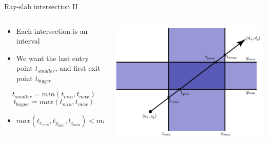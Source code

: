 \documentclass[xcolor=table]{beamer}
\begin{document}
\begin{frame}{Ray-slab intersection II}

\begin{columns}[T] %

\begin{column}{.48\textwidth}
\begin{itemize}
\item Each intersection is an interval
\item We want the last entry point $t_{smaller}$, and first exit point $t_{bigger}$
\end{itemize}

$$
t_{smaller} = min(t_{min}, t_{max})
$$
$$
t_{bigger} = max(t_{min}, t_{max})
$$
\begin{itemize}
\item $max(t_{x_{min}},t_{y_{min}},t_{z_{min}}) < min(t_{x_{max}},t_{y_{max}},t_{z_{max}})$
\end{itemize}
\end{column}%

\hfill%

\begin{column}{.48\textwidth}
\includegraphics[scale=0.25]{media/slab_2.png}
\end{column}%

\end{columns}

\end{frame}
\end{document}
